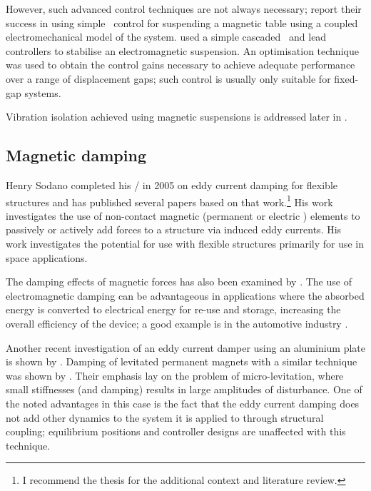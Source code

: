 \documentclass[11pt,a4paper]{memoir}
\begin{document}
However, such advanced control techniques are not always necessary; \textcite{li2007} report their success in using simple \PID\ control for suspending a magnetic table using a coupled electromechanical model of the system.
\textcite{banerjee2008} used a simple cascaded \PI\ and lead controllers to stabilise an electromagnetic suspension.
An optimisation technique was used to obtain the control gains necessary to achieve adequate performance over a range of displacement gaps; such control is usually only suitable for fixed-gap systems.

Vibration isolation achieved using magnetic suspensions is addressed later in .




\subsection{Magnetic damping}


Henry Sodano completed his \PhD/{} in 2005 \cite{sodano2005thesis} on
eddy current damping for flexible structures and has published several
papers based on that work.\footnote{I recommend the thesis for the
  additional context and literature review.} His work investigates the
use of non-contact magnetic (permanent \cite{sodano2005,sodano2006,sodano2008-dsmc} or
electric \cite{sodano2007}) elements to passively \cite{sodano2005} or
actively \cite{sodano2006,sodano2007,sodano2008-dsmc} add forces to a structure via
induced eddy currents. His work investigates the potential for use
with flexible structures primarily for use in space
applications.

The damping effects of magnetic forces has also been examined by
\textcite{bonisoli2006}. The use of electromagnetic damping can be
advantageous in applications where the absorbed energy is converted to
electrical energy for re-use and storage, increasing the overall
efficiency of the device; a good example is in the automotive industry
\cite{graves2000thesis}.

Another recent investigation of an eddy current damper using an aluminium
plate is shown by \textcite{ebrahimi2008}. Damping of levitated permanent
magnets with a similar technique was shown by \textcite{elbuken2006}. Their
emphasis lay on the problem of micro-levitation, where small stiffnesses (and
damping) results in large amplitudes of disturbance. One of the noted
advantages in this case is the fact that the eddy current damping does not add
other dynamics to the system it is applied to through structural coupling; equilibrium positions
and controller designs are unaffected with this technique.
\end{document}
